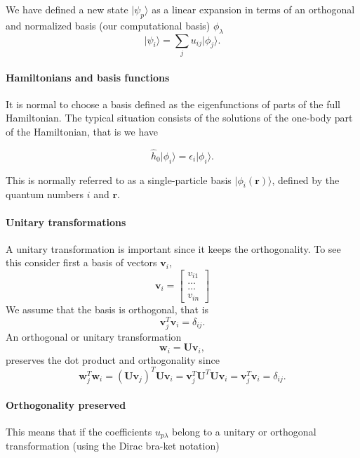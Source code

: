 We have defined a new state $\vert \psi_p\rangle$ as a linear expansion in terms of an orthogonal and normalized basis (our computational basis) $\phi_{\lambda}$
\begin{equation}
\vert \psi_i\rangle = \sum_{j} u_{ij}\vert \phi_{j}\rangle.
\end{equation}


\paragraph{Hamiltonians and basis functions}

It is normal to choose a basis defined as the eigenfunctions of parts
of the full Hamiltonian. The typical situation consists of the
solutions of the one-body part of the Hamiltonian, that is we have

\[
\hat{h}_0\vert \phi_{i}\rangle=\epsilon_{i}\vert \phi_{i}\rangle.
\]

This is normally referred to as a single-particle basis $\vert\phi_{i}(\mathbf{r})\rangle$,
defined by the quantum numbers $i$ and $\mathbf{r}$.


\paragraph{Unitary transformations}
A unitary transformation is important since it keeps the orthogonality.
To see this consider first a basis of vectors $\mathbf{v}_i$,
\[
\mathbf{v}_i = \begin{bmatrix} v_{i1} \\ \dots \\ \dots \\v_{in} \end{bmatrix}
\]
We assume that the basis is orthogonal, that is 
\[
\mathbf{v}_j^T\mathbf{v}_i = \delta_{ij}.
\]
An orthogonal or unitary transformation
\[
\mathbf{w}_i=\mathbf{U}\mathbf{v}_i,
\]
preserves the dot product and orthogonality since
\[
\mathbf{w}_j^T\mathbf{w}_i=(\mathbf{U}\mathbf{v}_j)^T\mathbf{U}\mathbf{v}_i=\mathbf{v}_j^T\mathbf{U}^T\mathbf{U}\mathbf{v}_i= \mathbf{v}_j^T\mathbf{v}_i = \delta_{ij}.
\]


\paragraph{Orthogonality preserved}

This means that if the coefficients $u_{p\lambda}$ belong to a unitary
or orthogonal transformation (using the Dirac bra-ket notation)

